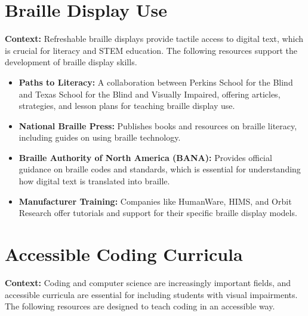 \section[Braille Display\index{braille display} Use]{Braille Display Use}\label{app4:braille-display-use}

\noindent
\textbf{Context:} Refreshable braille displays provide tactile access to digital text, which is crucial for literacy and STEM education. The following resources support the development of braille display skills.

\begin{itemize}
	\item \textbf{Paths to Literacy:} A collaboration between Perkins School for the Blind and Texas School for the Blind and Visually Impaired, offering articles, strategies, and lesson plans for teaching braille display use.
	\item \textbf{National Braille Press:} Publishes books and resources on braille literacy, including guides on using braille technology.
	\item \textbf{Braille Authority of North America (BANA):} Provides official guidance on braille codes and standards, which is essential for understanding how digital text is translated into braille.
	\item \textbf{Manufacturer Training:} Companies like HumanWare, HIMS, and Orbit Research offer tutorials and support for their specific braille display models.
\end{itemize}

\section[Accessible Coding Curricula]{Accessible Coding Curricula}\label{app4:coding-curricula}

\noindent
\textbf{Context:} Coding and computer science are increasingly important fields, and accessible curricula are essential for including students with visual impairments. The following resources are designed to teach coding in an accessible way.

